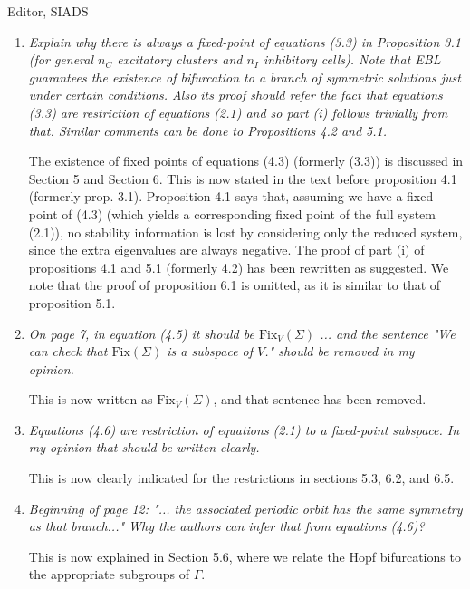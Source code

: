 \documentclass[11pt]{letter}
\begin{document}
\begin{letter}{Editor, SIADS}
\begin{enumerate}
\item \emph{Explain why there is always a fixed-point of equations (3.3) in Proposition 3.1 (for general $n_C$ excitatory clusters and $n_I$ inhibitory cells). Note that EBL guarantees the existence of bifurcation to a branch of symmetric solutions just under certain conditions. Also its proof should refer the fact that equations (3.3) are restriction of equations (2.1) and so part (i) follows trivially from that. Similar comments can be done to Propositions 4.2 and 5.1.}

\vspace{4mm} 
The existence of fixed points of equations (4.3) (formerly (3.3)) is discussed in Section 5 and Section 6. This is now stated in the text before proposition 4.1 (formerly prop. 3.1). Proposition 4.1 says that, assuming we have a fixed point of (4.3) (which yields a corresponding fixed point of the full system (2.1)), no stability information is lost by considering only the reduced system, since the extra eigenvalues are always negative. The proof of part (i) of propositions 4.1 and 5.1 (formerly 4.2) has been rewritten as suggested. We note that the proof of proposition 6.1 is omitted, as it is similar to that of proposition 5.1.

\item \emph{On page 7, in equation (4.5) it should be $\textrm{Fix}_V(\Sigma)$ ... and the sentence "We can check that $\textrm{Fix}(\Sigma)$ is a subspace of $V$." should be removed in my opinion. }

\vspace{4mm} 
This is now written as $\textrm{Fix}_V(\Sigma)$, and that sentence has been removed.

\item \emph{Equations (4.6) are restriction of equations (2.1) to a fixed-point subspace. In my opinion that should be written clearly.}

\vspace{4mm} 
This is now clearly indicated for the restrictions in sections 5.3, 6.2, and 6.5.

\item \emph{
Beginning of page 12: "... the associated periodic orbit has the same symmetry as that branch..." Why the authors can infer that from equations (4.6)?} 

\vspace{4mm} 
This is now explained in Section 5.6, where we relate the Hopf bifurcations to the appropriate subgroups of $\Gamma$.



\end{enumerate}
\end{letter}
\end{document}
